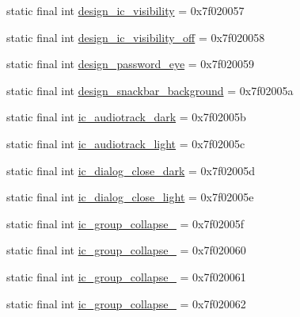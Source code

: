 \begin{CompactItemize}
\item 
static final int \hyperlink{classandroid_1_1support_1_1v7_1_1appcompat_1_1_r_1_1drawable_4ab02e89213c3e825e7640ef3e86785d}{design\_\-ic\_\-visibility} = 0x7f020057
\item 
static final int \hyperlink{classandroid_1_1support_1_1v7_1_1appcompat_1_1_r_1_1drawable_566f6b7f8e3ef1ce5ef5b3f3e6aeea81}{design\_\-ic\_\-visibility\_\-off} = 0x7f020058
\item 
static final int \hyperlink{classandroid_1_1support_1_1v7_1_1appcompat_1_1_r_1_1drawable_f9c0a48311c7d57650dc9e6e6db452bf}{design\_\-password\_\-eye} = 0x7f020059
\item 
static final int \hyperlink{classandroid_1_1support_1_1v7_1_1appcompat_1_1_r_1_1drawable_0f8cd64fd0153b3b5e998b2f23697516}{design\_\-snackbar\_\-background} = 0x7f02005a
\item 
static final int \hyperlink{classandroid_1_1support_1_1v7_1_1appcompat_1_1_r_1_1drawable_6cc23fef63c9c13d070c18be34957fe1}{ic\_\-audiotrack\_\-dark} = 0x7f02005b
\item 
static final int \hyperlink{classandroid_1_1support_1_1v7_1_1appcompat_1_1_r_1_1drawable_71e44ccc86578fe7269e15ab9bca6930}{ic\_\-audiotrack\_\-light} = 0x7f02005c
\item 
static final int \hyperlink{classandroid_1_1support_1_1v7_1_1appcompat_1_1_r_1_1drawable_c8124f84da4d3f7b562ed67bf5e1c28c}{ic\_\-dialog\_\-close\_\-dark} = 0x7f02005d
\item 
static final int \hyperlink{classandroid_1_1support_1_1v7_1_1appcompat_1_1_r_1_1drawable_403f3046246c674a74c141574b09abdb}{ic\_\-dialog\_\-close\_\-light} = 0x7f02005e
\item 
static final int \hyperlink{classandroid_1_1support_1_1v7_1_1appcompat_1_1_r_1_1drawable_a5cfe3ba846f9480fad080c59027c679}{ic\_\-group\_\-collapse\_} = 0x7f02005f
\item 
static final int \hyperlink{classandroid_1_1support_1_1v7_1_1appcompat_1_1_r_1_1drawable_d6f57969948f70a2351fa9290e662521}{ic\_\-group\_\-collapse\_} = 0x7f020060
\item 
static final int \hyperlink{classandroid_1_1support_1_1v7_1_1appcompat_1_1_r_1_1drawable_c6cb167648837dc0ab5d1fcfac7d5103}{ic\_\-group\_\-collapse\_} = 0x7f020061
\item 
static final int \hyperlink{classandroid_1_1support_1_1v7_1_1appcompat_1_1_r_1_1drawable_8f6bf5ce137ca25b4c68916e45d16667}{ic\_\-group\_\-collapse\_} = 0x7f020062
\item 

\end{CompactItemize}
